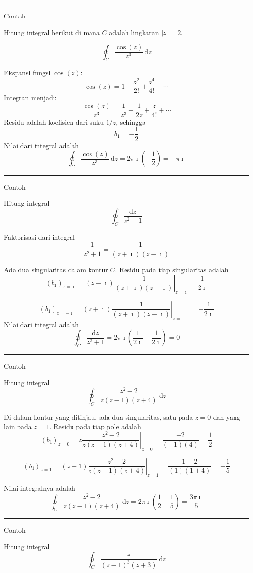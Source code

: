 \rule[0.5ex]{1\columnwidth}{1pt}

Contoh

Hitung integral berikut di mana $C$ adalah lingkaran $|z|=2$.

\[
\oint_{C}\frac{\cos(z)}{z^{3}}\ \mathrm{d}z
\]

Ekspansi fungsi $\cos(z)$:
\[
\cos(z)=1-\frac{z^{2}}{2!}+\frac{z^{4}}{4!}-\cdots
\]
Integran menjadi:
\[
\frac{\cos(z)}{z^{3}}=\frac{1}{z^{3}}-\frac{1}{2z}+\frac{z}{4!}+\cdots
\]
Residu adalah koefisien dari suku $1/z$, sehingga
\[
b_{1}=-\frac{1}{2}
\]
Nilai dari integral adalah
\[
\oint_{C}\frac{\cos(z)}{z^{3}}\ \mathrm{d}z=2\pi\imath\left(-\frac{1}{2}\right)=-\pi\imath
\]

\rule[0.5ex]{1\columnwidth}{1pt}

Contoh

Hitung integral
\[
\oint_{C}\frac{\mathrm{d}z}{z^{2}+1}
\]

Faktorisasi dari integral
\[
\frac{1}{z^{2}+1}=\frac{1}{(z+\imath)(z-\imath)}
\]

Ada dua singularitas dalam kontur $C$. Residu pada tiap singularitas
adalah
\[
\left(b_{1}\right)_{z=\imath}=\left.(z-\imath)\frac{1}{(z+\imath)(z-\imath)}\right|_{z=\imath}=\frac{1}{2\imath}
\]

\[
\left(b_{1}\right)_{z=-\imath}=\left.(z+\imath)\frac{1}{(z+\imath)(z-\imath)}\right|_{z=-\imath}=-\frac{1}{2\imath}
\]
Nilai dari integral adalah
\[
\oint_{C}\frac{\mathrm{d}z}{z^{2}+1}=2\pi\imath\left(\frac{1}{2\imath}-\frac{1}{2\imath}\right)=0
\]

\rule[0.5ex]{1\columnwidth}{1pt}

Contoh

Hitung integral
\[
\oint_{C}\frac{z^{2}-2}{z(z-1)(z+4)}\ \mathrm{d}z
\]

Di dalam kontur yang ditinjau, ada dua singularitas, satu pada $z=0$
dan yang lain pada $z=1$. Residu pada tiap pole adalah
\[
\left(b_{1}\right)_{z=0}=\left.z\frac{z^{2}-2}{z(z-1)(z+4)}\right|_{z=0}=\frac{-2}{(-1)(4)}=\frac{1}{2}
\]

\[
\left(b_{1}\right)_{z=1}=\left.(z-1)\frac{z^{2}-2}{z(z-1)(z+4)}\right|_{z=1}=\frac{1-2}{(1)(1+4)}=-\frac{1}{5}
\]

Nilai integralnya adalah
\[
\oint_{C}\frac{z^{2}-2}{z(z-1)(z+4)}\ \mathrm{d}z=2\pi\imath\left(\frac{1}{2}-\frac{1}{5}\right)=\frac{3\pi\imath}{5}
\]

\rule[0.5ex]{1\columnwidth}{1pt}

Contoh

Hitung integral
\[
\oint_{C}\frac{z}{(z-1)^{3}(z+3)}\ \mathrm{d}z
\]

